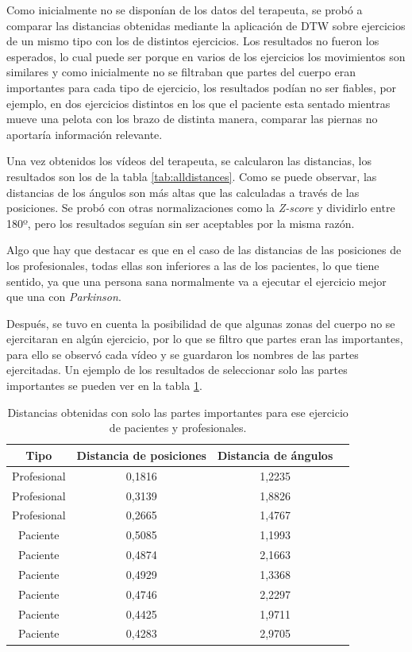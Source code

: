 Como inicialmente no se disponían de los datos del terapeuta, se probó a comparar las distancias obtenidas mediante la aplicación de DTW sobre ejercicios de un mismo tipo con los de distintos ejercicios. Los resultados no fueron los esperados, lo cual puede ser porque en varios de los ejercicios los movimientos son similares y como inicialmente no se filtraban que partes del cuerpo eran importantes para cada tipo de ejercicio, los resultados podían no ser fiables, por ejemplo, en dos ejercicios distintos en los que el paciente esta sentado mientras mueve una pelota con los brazo de distinta manera, comparar las piernas no aportaría información relevante. 

Una vez obtenidos los vídeos del terapeuta, se calcularon las distancias, los resultados son los de la tabla \ref{tab:alldistances}. Como se puede observar, las distancias de los ángulos son más altas que las calculadas a través de las posiciones. Se probó con otras normalizaciones como la \textit{Z-score} y dividirlo entre 180º, pero los resultados seguían sin ser aceptables por la misma razón.

Algo que hay que destacar es que en el caso de las distancias de las posiciones de los profesionales, todas ellas son inferiores a las de los pacientes, lo que tiene sentido, ya que una persona sana normalmente va a ejecutar el ejercicio mejor que una con \textit{Parkinson}.

Después, se tuvo en cuenta la posibilidad de que algunas zonas del cuerpo no se ejercitaran en algún ejercicio, por lo que se filtro que partes eran las importantes, para ello se observó cada vídeo y se guardaron los nombres de las partes ejercitadas. Un ejemplo de los resultados de seleccionar solo las partes importantes se pueden ver en la tabla \ref{tab:useddistances}.

\begin{table}
	\centering
	\begin{tabular}{|c|c|c|c|}
		\hline
		\textbf{Tipo}  & \textbf{Distancia de posiciones} & \textbf{Distancia de ángulos} \\
		\hline
		Profesional &  0,1816 & 1,2235 \\
		\hline
		Profesional &  0,3139 & 1,8826 \\
		\hline
		Profesional & 0,2665 & 1,4767 \\
		\hline
		Paciente &  0,5085 & 1,1993 \\
		\hline
		Paciente & 0,4874 & 2,1663 \\
		\hline
		Paciente  & 0,4929 & 1,3368 \\
		\hline
		Paciente & 0,4746 & 2,2297 \\
		\hline
		Paciente & 0,4425 & 1,9711 \\
		\hline
		Paciente & 0,4283 & 2,9705 \\
		\hline
	\end{tabular}
	\caption{Distancias obtenidas con solo las partes importantes para ese ejercicio de pacientes y profesionales.}
	\label{tab:useddistances}
\end{table}

